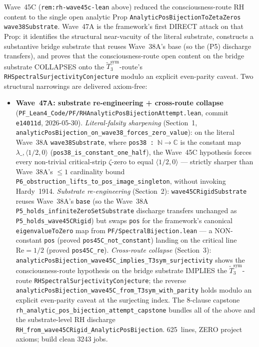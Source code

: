 \begin{remark}\label{rem:rh-wave47a-lean}
Wave~45C (\texttt{rem:rh-wave45c-lean} above) reduced the consciousness-route RH content to the single open analytic Prop \texttt{AnalyticPosBijectionToZetaZeros wave38Substrate}. Wave~47A is the framework's first DIRECT attack on that Prop: it identifies the structural near-vacuity of the literal substrate, constructs a substantive bridge substrate that reuses Wave~38A's base (so the (P5) discharge transfers), and proves that the consciousness-route open content on the bridge substrate COLLAPSES onto the $\widetilde{T}_3^{\mathrm{sym}}$-route's \texttt{RHSpectralSurjectivityConjecture} modulo an explicit even-parity caveat. Two structural narrowings are delivered axiom-free:
\begin{itemize}
  \item \textbf{Wave~47A: substrate re-engineering + cross-route collapse} (\texttt{PF\_Lean4\_Code/PF/RHAnalyticPosBijectionAttempt.lean}, commit \texttt{e14011d}, 2026-05-30). \emph{Literal-falsity sharpening} (Section~1, \texttt{analyticPosBijection\_on\_wave38\_forces\_zero\_value}): on the literal Wave~38A \texttt{wave38Substrate}, where \texttt{pos38 : $\mathbb{N} \to \mathbb{C}$} is the constant map $\lambda\_,\langle 1/2, 0\rangle$ (\texttt{pos38\_is\_constant\_one\_half}), the Wave~45C hypothesis forces every non-trivial critical-strip $\zeta$-zero to equal $\langle 1/2, 0\rangle$ --- strictly sharper than Wave~38A's $\leq 1$ cardinality bound \texttt{P6\_obstruction\_lifts\_to\_pos\_image\_singleton}, without invoking Hardy~1914. \emph{Substrate re-engineering} (Section~2): \texttt{wave45CRigidSubstrate} reuses Wave~38A's \texttt{base} (so the Wave~38A \texttt{P5\_holds\_infiniteZeroSetSubstrate} discharge transfers unchanged as \texttt{P5\_holds\_wave45CRigid}) but swaps \texttt{pos} for the framework's canonical \texttt{eigenvalueToZero} map from \texttt{PF/SpectralBijection.lean} --- a NON-constant \texttt{pos} (proved \texttt{pos45C\_not\_constant}) landing on the critical line $\mathrm{Re} = 1/2$ (proved \texttt{pos45C\_re}). \emph{Cross-route collapse} (Section~3): \texttt{analyticPosBijection\_wave45C\_implies\_T3sym\_surjectivity} shows the consciousness-route hypothesis on the bridge substrate IMPLIES the $\widetilde{T}_3^{\mathrm{sym}}$-route \texttt{RHSpectralSurjectivityConjecture}; the reverse \texttt{analyticPosBijection\_wave45C\_from\_T3sym\_with\_parity} holds modulo an explicit even-parity caveat at the surjecting index. The 8-clause capstone \texttt{rh\_analytic\_pos\_bijection\_attempt\_capstone} bundles all of the above and the substrate-level RH discharge \texttt{RH\_from\_wave45CRigid\_AnalyticPosBijection}. 625~lines, ZERO project axioms; build clean 3243 jobs.

\end{itemize}
\end{remark}
